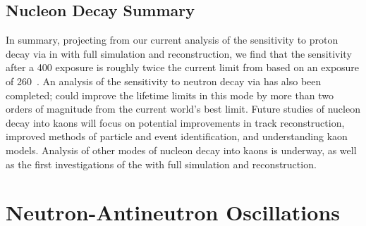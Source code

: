 \subsection{Nucleon Decay Summary}
\label{sec:ndksummary}

In summary, projecting from our current analysis of the sensitivity to proton decay via \ptoknubar in  with full simulation and reconstruction, we find that the sensitivity after a \SI{400}{\ktyr} exposure
is roughly twice the current limit from \superk based on an exposure of \SI{260}{\ktyr}~\cite{Abe:2014mwa}.  
An analysis of the sensitivity to neutron decay via \ntoek has also been completed;  could improve the lifetime limits in this mode by more than two orders of magnitude from the current world's best limit.  Future studies of nucleon decay into kaons will focus on potential improvements in track reconstruction, improved methods of particle and event identification, and understanding kaon  models.  
Analysis of other modes of nucleon decay into kaons is underway, as well as the first investigations of the \ptoepizero with full simulation and reconstruction.



\section{Neutron-Antineutron Oscillations}
\label{sec:nonaccel-nnbar}

